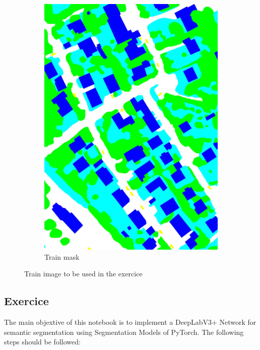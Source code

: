 \documentclass[10pt, a4paper]{article}
\begin{document}
\begin{figure}[htpb]
\begin{subfigure}[b]{0.32\textwidth}
      \includegraphics[width=\textwidth]{images/Reference_Train.pdf}
      \caption{Train mask}
      \label{fig:example_test}
  \end{subfigure}
  \caption{Train image to be used in the exercice}
  \label{fig:example}
\end{figure}

\subsection{Exercice}


The main objextive of this notebook is to implement a DeepLabV3+ Network for semantic segmentation using Segmentation Models of PyTorch. 
The following steps should be followed:
\end{document}
